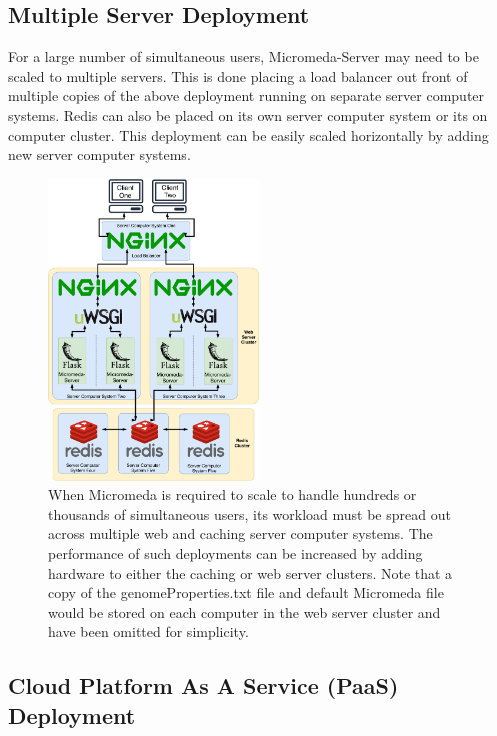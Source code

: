 \subsection{Multiple Server Deployment}

For a large number of simultaneous users, Micromeda-Server may need to be scaled to multiple servers. This is done placing a load balancer out front of multiple copies of the above deployment running on separate server computer systems. Redis can also be placed on its own server computer system or its on computer cluster. This deployment can be easily scaled horizontally by adding new server computer systems.

\begin{figure}[!ht]
  \centering
	\includegraphics[width=0.50\textwidth]{media/micromeda-heavy-deployment.pdf}
	 \caption{When Micromeda is required to scale to handle hundreds or thousands of simultaneous users, its workload must be spread out across multiple web and caching server computer systems. The performance of such deployments can be increased by adding hardware to either the caching or web server clusters. Note that a copy of the genomeProperties.txt file and default Micromeda file would be stored on each computer in the web server cluster and have been omitted for simplicity.}
	 \label{fig:micromeda-large-deploy}
\end{figure}

\subsection{Cloud Platform As A Service (PaaS) Deployment}

